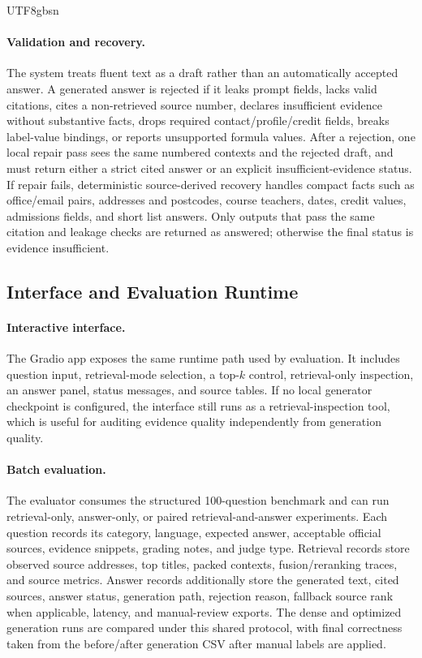 \documentclass{article}
\begin{document}
\begin{CJK*}{UTF8}{gbsn}
\paragraph{Validation and recovery.}
The system treats fluent text as a draft rather than an automatically accepted answer. A generated answer is rejected if it leaks prompt fields, lacks valid citations, cites a non-retrieved source number, declares insufficient evidence without substantive facts, drops required contact/profile/credit fields, breaks label-value bindings, or reports unsupported formula values. After a rejection, one local repair pass sees the same numbered contexts and the rejected draft, and must return either a strict cited answer or an explicit insufficient-evidence status. If repair fails, deterministic source-derived recovery handles compact facts such as office/email pairs, addresses and postcodes, course teachers, dates, credit values, admissions fields, and short list answers. Only outputs that pass the same citation and leakage checks are returned as answered; otherwise the final status is evidence insufficient.

\subsection{Interface and Evaluation Runtime}

\paragraph{Interactive interface.}
The Gradio app exposes the same runtime path used by evaluation. It includes question input, retrieval-mode selection, a top-$k$ control, retrieval-only inspection, an answer panel, status messages, and source tables. If no local generator checkpoint is configured, the interface still runs as a retrieval-inspection tool, which is useful for auditing evidence quality independently from generation quality.

\paragraph{Batch evaluation.}
The evaluator consumes the structured 100-question benchmark and can run retrieval-only, answer-only, or paired retrieval-and-answer experiments. Each question records its category, language, expected answer, acceptable official sources, evidence snippets, grading notes, and judge type. Retrieval records store observed source addresses, top titles, packed contexts, fusion/reranking traces, and source metrics. Answer records additionally store the generated text, cited sources, answer status, generation path, rejection reason, fallback source rank when applicable, latency, and manual-review exports. The dense and optimized generation runs are compared under this shared protocol, with final correctness taken from the before/after generation CSV after manual labels are applied.


\end{CJK*}
\end{document}
